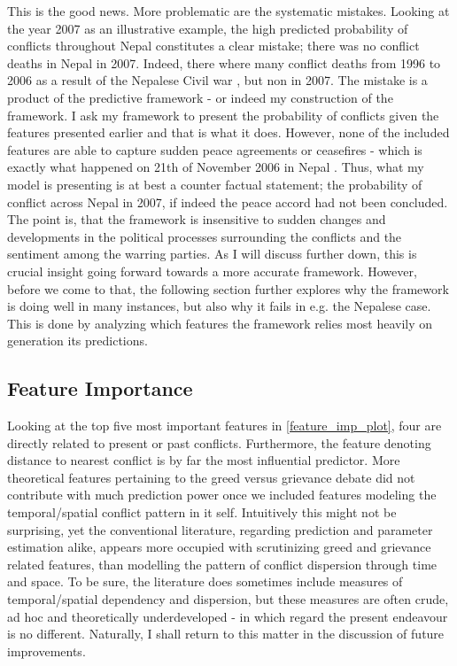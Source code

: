 \documentclass[a4paper]{article}
\begin{document}
This is the good news. More problematic are the systematic mistakes. Looking at the year 2007 as an illustrative example, the high predicted probability of conflicts throughout Nepal constitutes a clear mistake; there was no conflict deaths in Nepal in 2007. Indeed, there where many conflict deaths from 1996 to 2006 as a result of the Nepalese Civil war \citep{ohchr2012nepal}, but non in 2007. The mistake is a product of the predictive framework - or indeed my construction of the framework. I ask my framework to present the probability of conflicts given the features presented earlier and that is what it does. However, none of the included features are able to capture sudden peace agreements or ceasefires - which is exactly what happened on 21th of November 2006 in Nepal \citep{ohchr2012nepal}. Thus, what my model is presenting is at best a counter factual statement; the probability of conflict across Nepal in 2007, if indeed the peace accord had not been concluded. The point is, that the framework is insensitive to sudden changes and developments in the political processes surrounding the conflicts and the sentiment among the warring parties. As I will discuss further down, this is crucial insight going forward towards a more accurate framework. However, before we come to that, the following section further explores why the framework is doing well in many instances, but also why it fails in e.g. the Nepalese case. This is done by analyzing which features the framework relies most heavily on generation its predictions.\par


\subsection{Feature Importance}

Looking at the top five most important features in \autoref{feature_imp_plot}, four are directly related to present or past conflicts. Furthermore, the feature denoting distance to nearest conflict is by far the most influential predictor. More theoretical features pertaining to the greed versus grievance debate did not contribute with much prediction power once we included features modeling the temporal/spatial conflict pattern in it self. Intuitively this might not be surprising, yet the conventional literature, regarding prediction and parameter estimation alike, appears more occupied with scrutinizing greed and grievance related features, than modelling the pattern of conflict dispersion through time and space. To be sure, the literature does sometimes include measures of temporal/spatial dependency and dispersion, but these measures are often crude, ad hoc and theoretically underdeveloped - in which regard the present endeavour is no different. Naturally, I shall return to this matter in the discussion of future improvements.\par
\end{document}
